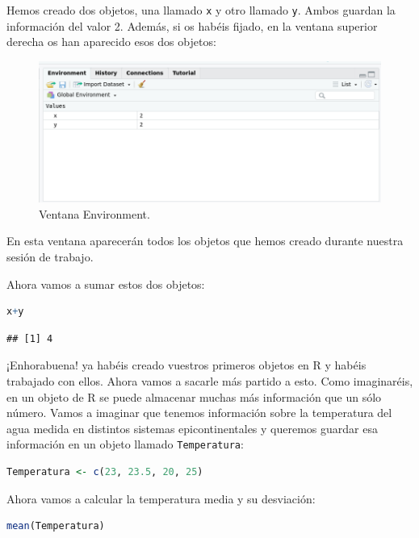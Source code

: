 \documentclass[
]{book}
\newcommand{\passthrough}[1]{#1}
\begin{document}
Hemos creado dos objetos, una llamado \passthrough{\lstinline!x!} y otro llamado \passthrough{\lstinline!y!}. Ambos guardan la información del valor 2. Además, si os habéis fijado, en la ventana superior derecha os han aparecido esos dos objetos:

\begin{figure}

{\centering \includegraphics[width=1\linewidth]{Img/Environment_R_2} 

}

\caption{Ventana Environment.}\label{fig:unnamed-chunk-14}
\end{figure}

En esta ventana aparecerán todos los objetos que hemos creado durante nuestra sesión de trabajo.

Ahora vamos a sumar estos dos objetos:

\begin{lstlisting}[language=R]
x+y
\end{lstlisting}

\begin{lstlisting}
## [1] 4
\end{lstlisting}

¡Enhorabuena! ya habéis creado vuestros primeros objetos en R y habéis trabajado con ellos. Ahora vamos a sacarle más partido a esto. Como imaginaréis, en un objeto de R se puede almacenar muchas más información que un sólo número. Vamos a imaginar que tenemos información sobre la temperatura del agua medida en distintos sistemas epicontinentales y queremos guardar esa información en un objeto llamado \passthrough{\lstinline!Temperatura!}:

\begin{lstlisting}[language=R]
Temperatura <- c(23, 23.5, 20, 25)
\end{lstlisting}

Ahora vamos a calcular la temperatura media y su desviación:

\begin{lstlisting}[language=R]
mean(Temperatura)
\end{lstlisting}
\end{document}
